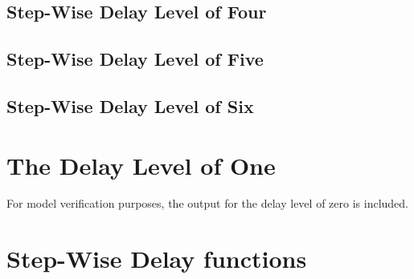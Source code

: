 \subsection{Step-Wise Delay Level of Four}

\subsection{Step-Wise Delay Level of Five}

\subsection{Step-Wise Delay Level of Six}



\section{The Delay Level of One}
For model verification purposes, the output for the delay level of zero is included.

\begin{small}
\end{small}






\section{Step-Wise Delay functions}













